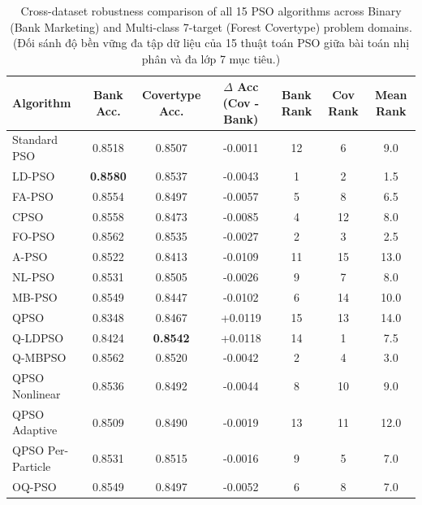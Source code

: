 \begin{table}[htbp]
\centering
\fontsize{8.5pt}{11pt}\selectfont
\caption{Cross-dataset robustness comparison of all 15 PSO algorithms across Binary (Bank Marketing) and Multi-class 7-target (Forest Covertype) problem domains. \\ (Đối sánh độ bền vững đa tập dữ liệu của 15 thuật toán PSO giữa bài toán nhị phân và đa lớp 7 mục tiêu.)}
\label{tab:cross_dataset_15algos}
\vspace{3pt}
\begin{tabular}{lcccccc}
\hline\hline
\textbf{Algorithm} & \textbf{Bank Acc.} & \textbf{Covertype Acc.} & \textbf{$\Delta$ Acc (Cov - Bank)} & \textbf{Bank Rank} & \textbf{Cov Rank} & \textbf{Mean Rank} \\
\hline
Standard PSO & 0.8518 & 0.8507 & -0.0011 & 12 & 6 & 9.0 \\
LD-PSO & \textbf{0.8580} & 0.8537 & -0.0043 & 1 & 2 & 1.5 \\
FA-PSO & 0.8554 & 0.8497 & -0.0057 & 5 & 8 & 6.5 \\
CPSO & 0.8558 & 0.8473 & -0.0085 & 4 & 12 & 8.0 \\
\hline
FO-PSO & 0.8562 & 0.8535 & -0.0027 & 2 & 3 & 2.5 \\
A-PSO & 0.8522 & 0.8413 & -0.0109 & 11 & 15 & 13.0 \\
NL-PSO & 0.8531 & 0.8505 & -0.0026 & 9 & 7 & 8.0 \\
MB-PSO & 0.8549 & 0.8447 & -0.0102 & 6 & 14 & 10.0 \\
\hline
QPSO & 0.8348 & 0.8467 & +0.0119 & 15 & 13 & 14.0 \\
Q-LDPSO & 0.8424 & \textbf{0.8542} & +0.0118 & 14 & 1 & 7.5 \\
Q-MBPSO & 0.8562 & 0.8520 & -0.0042 & 2 & 4 & 3.0 \\
\hline
QPSO Nonlinear & 0.8536 & 0.8492 & -0.0044 & 8 & 10 & 9.0 \\
QPSO Adaptive & 0.8509 & 0.8490 & -0.0019 & 13 & 11 & 12.0 \\
QPSO Per-Particle & 0.8531 & 0.8515 & -0.0016 & 9 & 5 & 7.0 \\
OQ-PSO & 0.8549 & 0.8497 & -0.0052 & 6 & 8 & 7.0 \\
\hline\hline
\end{tabular}
\end{table}
